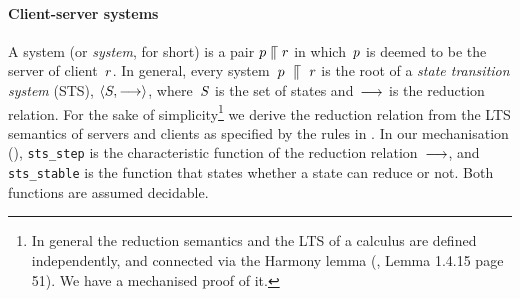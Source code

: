 \paragraph{Client-server systems} %
%
%
%
%
A {\em \svrclt} system (or {\em system}, for short) is a pair
$p \mathrel{\llceil} r$ in which~$p$ is deemed to be the server of
client~$r$.
%
%
In general, every system~$p~ \mathrel{\llceil} ~r$ is the root of a
{\em state transition system} (STS), $\langle  S ,  \mathrel{\overset{ }\longrightarrow} \rangle $,
where~$S$ is the set of states and~$\mathrel{\overset{}\longrightarrow}$ is the reduction
relation.  For the sake of simplicity\footnote{In general the
  reduction semantics and the LTS of a calculus are defined
  independently, and connected via the Harmony lemma
  (\cite{sangiorgi}, Lemma 1.4.15 page 51).  %
  We have a mechanised proof of it.}%
  we derive the reduction relation from the LTS
semantics of servers and clients as specified by the rules in
.
In our mechanisation (), \texttt{sts_step}
is the
characteristic function of the reduction relation~$\mathrel{\overset{}\longrightarrow}$, and
\texttt{sts_stable}
is the function that states whether a state can
reduce or not. Both functions are assumed decidable.

